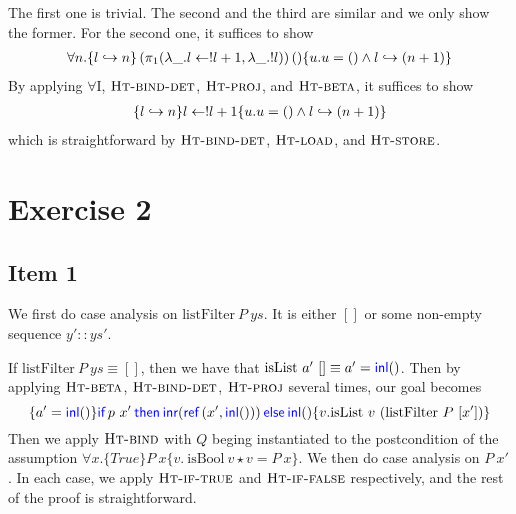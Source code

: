 \documentclass{article}
\begin{document}
The first one is trivial. The second and the third are similar and we only show the former.
For the second one, it suffices to show
\begin{align*}
    \forall n. \{l \hookrightarrow n\} \left( \pi_1 (\lambda \_ . l \leftarrow !l+1, \lambda \_ . !l) \right) () \{u.u=() \wedge l \hookrightarrow (n+1)\}
\end{align*}
By applying $\forall$I, $\textsc{Ht-bind-det}$, $\textsc{Ht-proj}$, and $\textsc{Ht-beta}$, it suffices to show
\begin{align*}
    \{l \hookrightarrow n\} l \leftarrow !l+1 \{u.u=() \wedge l \hookrightarrow (n+1)\}
\end{align*}
which is straightforward by $\textsc{Ht-bind-det}$, $\textsc{Ht-load}$, and $\textsc{Ht-store}$.

\section*{Exercise 2}

\subsection*{Item 1}

We first do case analysis on $\text{listFilter} \ P \ ys$. It is either
$[]$ or some non-empty sequence $y' :: ys'$.

If $\text{listFilter} \ P \ ys \equiv []$, then we have that
$\text{isList} \ a' \ [] \equiv a' = \textsf{\color{blue} inl}()$. Then by applying
$\textsc{Ht-beta}$, $\textsc{Ht-bind-det}$,
$\textsc{Ht-proj}$ several times, our goal becomes
$$
    \{a' = \Inl()\}
    \If{p \ x'}then{\Inr(\Ref(x',\Inl()))}\Else{\Inl()}
    \{v. \text{isList} \ v \ (\text{listFilter} \ P \ [x'])\}
$$
Then we apply $\textsc{Ht-bind}$ with $Q$ beging instantiated to
the postcondition of the assumption
$\forall x. \{True\} P \ x \{v. \ \text{isBool} \ v \star v = P \ x\}$.
We then do case analysis on $P \ x'$. In each case, we apply
$\textsc{Ht-if-true}$ and $\textsc{Ht-if-false}$ respectively, and
the rest of the proof is straightforward.
\end{document}
